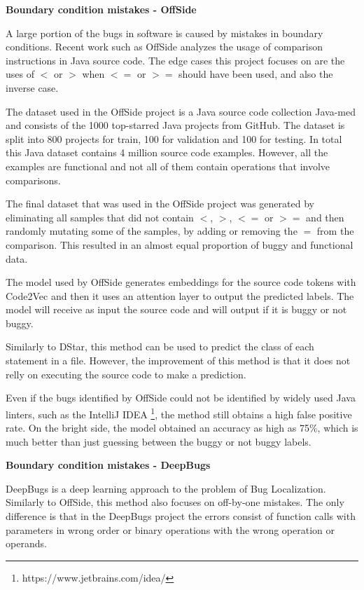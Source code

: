 \documentclass[12pt,a4paper]{report}
\begin{document}
\textbf{Boundary condition mistakes - OffSide}

A large portion of the bugs in software is caused by mistakes in boundary conditions. Recent work such as OffSide \cite{10.1145/3387940.3391464} analyzes the usage of comparison instructions in Java source code. The edge cases this project focuses on are the uses of $<$ or $>$ when $<=$ or $>=$ should have been used, and also the inverse case.

The dataset used in the OffSide project is a Java source code collection Java-med \cite{alon2019code2seq} and consists of the 1000 top-starred Java projects from GitHub. The dataset is split into 800 projects for train, 100 for validation and 100 for testing. In total this Java dataset contains 4 million source code examples. However, all the examples are functional and not all of them contain operations that involve comparisons.

The final dataset that was used in the OffSide project was generated by eliminating all samples that did not contain $<$, $>$, $<=$ or $>=$ and then randomly mutating some of the samples, by adding or removing the $=$ from the comparison. This resulted in an almost equal proportion of buggy and functional data.

The model used by OffSide generates embeddings for the source code tokens with Code2Vec and then it uses an attention layer to output the predicted labels. The model will receive as input the source code and will output if it is buggy or not buggy.

Similarly to DStar, this method can be used to predict the class of each statement in a file. However, the improvement of this method is that it does not relly on executing the source code to make a prediction.

Even if the bugs identified by OffSide could not be identified by widely used Java linters, such as the IntelliJ IDEA \footnote{https://www.jetbrains.com/idea/}, the method still obtains a high false positive rate. On the bright side, the model obtained an accuracy as high as 75\%, which is much better than just guessing between the buggy or not buggy labels.

\textbf{Boundary condition mistakes - DeepBugs}

DeepBugs \cite{10.1145/3276517} is a deep learning approach to the problem of Bug Localization. Similarly to OffSide, this method also focuses on off-by-one mistakes. The only difference is that in the DeepBugs project the errors consist of function calls with parameters in wrong order or binary operations with the wrong operation or operands.
\end{document}
